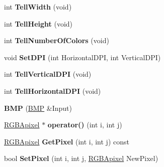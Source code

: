\begin{DoxyCompactItemize}
\item 
\hypertarget{class_b_m_p_addbaef07743df3bc6b15195709015d1a}{int {\bfseries Tell\-Width} (void)}\label{class_b_m_p_addbaef07743df3bc6b15195709015d1a}

\item 
\hypertarget{class_b_m_p_a76cff2e39ca9e1c3d7f2d6bbec0a3091}{int {\bfseries Tell\-Height} (void)}\label{class_b_m_p_a76cff2e39ca9e1c3d7f2d6bbec0a3091}

\item 
\hypertarget{class_b_m_p_a2db1f1954c322028359d2c8db084f8d6}{int {\bfseries Tell\-Number\-Of\-Colors} (void)}\label{class_b_m_p_a2db1f1954c322028359d2c8db084f8d6}

\item 
\hypertarget{class_b_m_p_a7ff803dfff74e560f648ac25dce0846d}{void {\bfseries Set\-D\-P\-I} (int Horizontal\-D\-P\-I, int Vertical\-D\-P\-I)}\label{class_b_m_p_a7ff803dfff74e560f648ac25dce0846d}

\item 
\hypertarget{class_b_m_p_ad0d9bf394d15684619ff7516457059b3}{int {\bfseries Tell\-Vertical\-D\-P\-I} (void)}\label{class_b_m_p_ad0d9bf394d15684619ff7516457059b3}

\item 
\hypertarget{class_b_m_p_a2000c6bed1e4a1776fa625e6a8c7c8a3}{int {\bfseries Tell\-Horizontal\-D\-P\-I} (void)}\label{class_b_m_p_a2000c6bed1e4a1776fa625e6a8c7c8a3}

\item 
\hypertarget{class_b_m_p_a3c73465aac82d707e77871c66dc4d2f9}{{\bfseries B\-M\-P} (\hyperlink{class_b_m_p}{B\-M\-P} \&Input)}\label{class_b_m_p_a3c73465aac82d707e77871c66dc4d2f9}

\item 
\hypertarget{class_b_m_p_a6aa96d52812c8d5be56df269adaa2558}{\hyperlink{struct_r_g_b_apixel}{R\-G\-B\-Apixel} $\ast$ {\bfseries operator()} (int i, int j)}\label{class_b_m_p_a6aa96d52812c8d5be56df269adaa2558}

\item 
\hypertarget{class_b_m_p_aeb43ee5e67bfd5866eb0a24ae9cca218}{\hyperlink{struct_r_g_b_apixel}{R\-G\-B\-Apixel} {\bfseries Get\-Pixel} (int i, int j) const }\label{class_b_m_p_aeb43ee5e67bfd5866eb0a24ae9cca218}

\item 
\hypertarget{class_b_m_p_ae378a2baa9e7690b94a0b37d29719818}{bool {\bfseries Set\-Pixel} (int i, int j, \hyperlink{struct_r_g_b_apixel}{R\-G\-B\-Apixel} New\-Pixel)}\label{class_b_m_p_ae378a2baa9e7690b94a0b37d29719818}


\end{DoxyCompactItemize}
